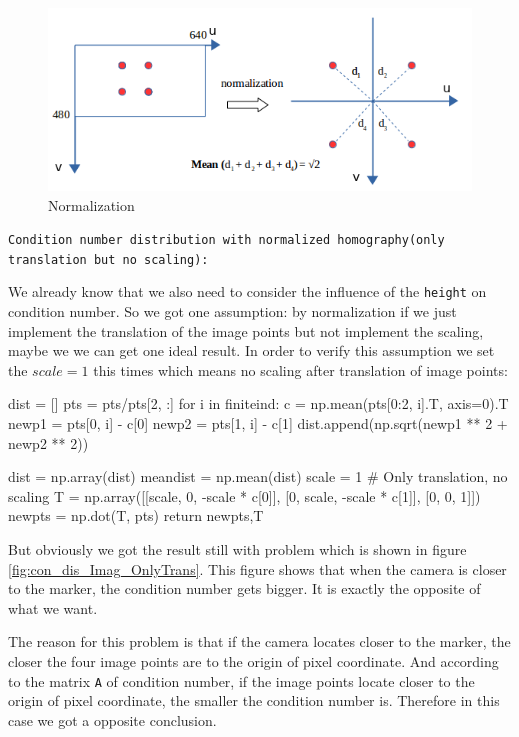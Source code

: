 \begin{figure}[H]
\centering
\includegraphics[scale=0.8]{./fig/normalization.png}
\caption{Normalization}  
\label{fig:normalization}
\end{figure}

\texttt{Condition number distribution with normalized homography(only translation but no scaling):}

We already know that we also need to consider the influence of the \texttt{height} on condition number. So we got one assumption: by normalization if we just implement the translation of the image points but not implement the scaling, maybe we we can get one ideal result. In order to verify this assumption we set the $scale = 1$ this times which means no scaling after translation of image points: 
\begin{python}\label{python:regular}
dist = []
pts = pts/pts[2, :]
for i in finiteind:
    c = np.mean(pts[0:2, i].T, axis=0).T
    newp1 = pts[0, i] - c[0]
    newp2 = pts[1, i] - c[1]
    dist.append(np.sqrt(newp1 ** 2 + newp2 ** 2))

dist = np.array(dist)
meandist = np.mean(dist)
scale = 1 # Only translation, no scaling
T = np.array([[scale, 0, -scale * c[0]], [0, scale, -scale * c[1]], [0, 0, 1]])
newpts = np.dot(T, pts)
return newpts,T
\end{python}

But obviously we got the result still with problem which is shown in figure \ref{fig:con_dis_Imag_OnlyTrans}. This figure shows that when the camera is closer to the marker, the condition number gets bigger. It is exactly the opposite of what we want.

The reason for this problem is that if the camera locates closer to the marker, the closer the four image points are to the origin of pixel coordinate. And according to the matrix \texttt{A} of condition number, if the image points locate closer to the origin of pixel coordinate, the smaller the condition number is. Therefore in this case we got a opposite conclusion.

